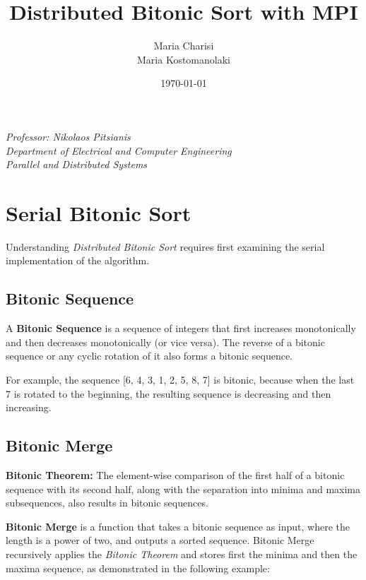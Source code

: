\documentclass[12pt]{article}
\title{\textbf{Distributed Bitonic Sort with MPI}}
\author{Maria Charisi\\Maria Kostomanolaki}
\date{\today}
\begin{document}
\maketitle

\tableofcontents

\vfill
\begin{center}
    \textit{Professor: Nikolaos Pitsianis\\
    Department of Electrical and Computer Engineering\\
    Parallel and Distributed Systems}
\end{center}
\newpage

\section{Serial Bitonic Sort}

Understanding \textit{Distributed Bitonic Sort} requires first examining the serial implementation of the algorithm.

\subsection{Bitonic Sequence}

\begin{definitionbox}
A \textbf{Bitonic Sequence} is a sequence of integers that first increases monotonically and then decreases monotonically (or vice versa). The reverse of a bitonic sequence or any cyclic rotation of it also forms a bitonic sequence.
\end{definitionbox}

For example, the sequence [6, 4, 3, 1, 2, 5, 8, 7] is bitonic, because when the last 7 is rotated to the beginning, the resulting sequence is decreasing and then increasing.


\subsection{Bitonic Merge}

\begin{definitionbox}
\textbf{Bitonic Theorem:} The element-wise comparison of the first half of a bitonic sequence with its second half, along with the separation into minima and maxima subsequences, also results in bitonic sequences.
\end{definitionbox}

\textbf{Bitonic Merge} is a function that takes a bitonic sequence as input, where the length is a power of two, and outputs a sorted sequence. Bitonic Merge recursively applies the \textit{Bitonic Theorem} and stores first the minima and then the maxima sequence, as demonstrated in the following example:
\end{document}

